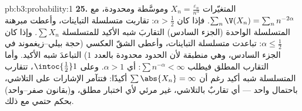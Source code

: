 \begin{solution}{pb:b3:probability:1}
\textbf{25.} المتغيّرات $X_n = \frac{\varepsilon_n}
{n^\alpha}$  وموسَّطة ومحدودة، مع
$\sum_n\V(X_n) = \sum_nn^{-2\alpha}$. فإذا كان $\alpha >
\frac12$: تقاربت متسلسلة التباينات، وأعطت
مبرهنة المتسلسلة الواحدة (الجزء السادس) التقاربَ شبه الأكيد
للمتسلسلة $\sum X_n$. وإذا كان $\alpha \leq \frac12$: تباعدت متسلسلة
التباينات، وأعطى الشقّ العكسي (حجة بيلي--زيغموند في الجزء
السادس، وهي منطبقة لأن الحدود محدودة بالعدد $1$) التباعدَ شبه
الأكيد. وأما التقارب المطلق فيطلب $\sum n^{-\alpha} < \infty$: أي $\alpha > 1$.
وعلى $\intoc{\frac12}1$، تتقارب المتسلسلة شبه أكيد رغم أن $\sum\abs{X_n} = \infty$ أكيدًا:
فتتآمر الإشارات على التلاشي، باحتمال واحد --- أي تقاربٌ
بالتلاشي، غير مرئي لأي اختبار مطلق، و(بقانون صفر--واحد) بحكم
حتمي مع ذلك.
\end{solution}
